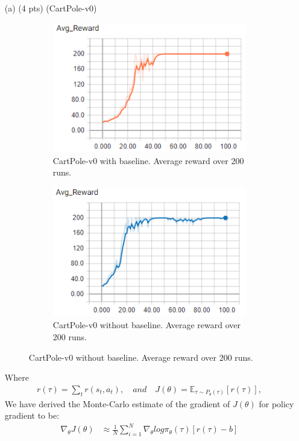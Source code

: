 \documentclass{article}
\newcommand{\Ex}{\mathbb E}
\begin{document}
\begin{enumerate}
\item[(a) (4 pts)] (CartPole-v0)
\begin{figure}[h]
	\centering
	\begin{subfigure}[b]{.4\textwidth}
		\centering
		\includegraphics[width=0.9\linewidth]{cartpole-baseline-avgreward.png}
		\caption{CartPole-v0 with baseline. Average reward over 200 runs.}
	\end{subfigure}
	\qquad
	\begin{subfigure}[b]{.4\textwidth}
		\centering
		\includegraphics[width=0.9\linewidth]{cartpole-nobaseline-avgreward.png}
		\caption{CartPole-v0 without baseline. Average reward over 200 runs.}
	\end{subfigure}
\end{figure}

Where
\begin{align*}
r(\tau) = \sum_{t}^{} r(s_t, a_t), \quad and \quad J(\theta) = \Ex_{\tau \sim P_{\theta}(\tau)}[r(\tau)],
\end{align*}
We have derived the Monte-Carlo estimate of the gradient of $J(\theta)$ for policy gradient to be:
\begin{align*}
\nabla_{\theta} J(\theta) &\approx \frac{1}{N}\sum_{i=1}^{N}\nabla_{\theta}log\pi_{\theta}(\tau)[r(\tau)-b]
\end{align*}


\end{enumerate}
\end{document}
